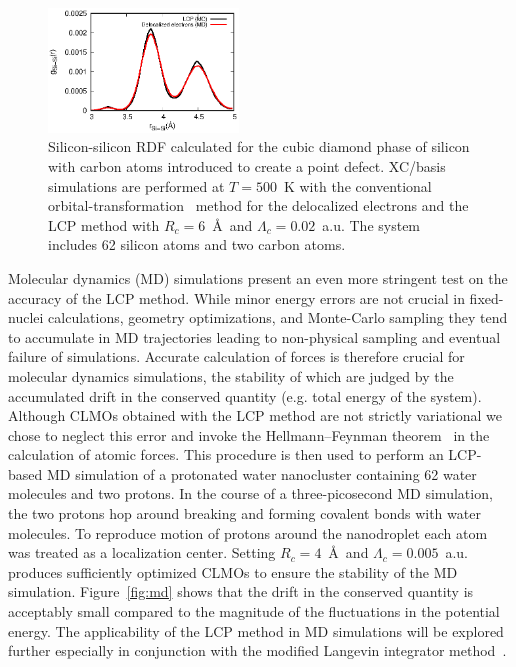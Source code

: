\documentclass[10pt,amsmath,twocolumn,aps,prl,superscriptaddress,floatfix]{revtex4-1}
\begin{document}
\begin{figure}
\centering
\includegraphics[width=0.45\textwidth]{rdf_si}
\caption{Silicon-silicon RDF calculated for the cubic diamond phase of silicon with carbon atoms introduced to create a point defect. XC/basis simulations are performed at $T=500$~K with the conventional orbital-transformation~\cite{vandevondele2003efficient} method for the delocalized electrons and the LCP method with $R_c = 6$~\AA\ and $\Lambda_c = 0.02$~a.u. The system includes 62 silicon atoms and two carbon atoms.}
\label{fig:mc}
\end{figure}


Molecular dynamics (MD) simulations present an even more stringent test on the accuracy of the LCP method. While minor energy errors are not crucial in fixed-nuclei calculations, geometry optimizations, and Monte-Carlo sampling they tend to accumulate in MD trajectories leading to non-physical sampling and eventual failure of simulations. Accurate calculation of forces is therefore crucial for molecular dynamics simulations, the stability of which are judged by the accumulated drift in the conserved quantity (e.g. total energy of the system). Although CLMOs obtained with the LCP method are not strictly variational we chose to neglect this error and invoke the Hellmann--Feynman theorem~\cite{feynman1939forces} in the calculation of atomic forces. This procedure is then used to perform an LCP-based MD simulation of a protonated water nanocluster containing 62 water molecules and two protons. In the course of a three-picosecond MD simulation, the two protons hop around breaking and forming covalent bonds with water molecules. To reproduce motion of protons around the nanodroplet each atom was treated as a localization center. Setting $R_c = 4$~\AA\ and $\Lambda_c = 0.005$~a.u. produces sufficiently optimized CLMOs to ensure the stability of the MD simulation. Figure~\ref{fig:md} shows that the drift in the conserved quantity is acceptably small compared to the magnitude of the fluctuations in the potential energy. The applicability of the LCP method in MD simulations will be explored further especially in conjunction with the modified Langevin integrator method~\cite{scheiber2018communication}. 
\end{document}
